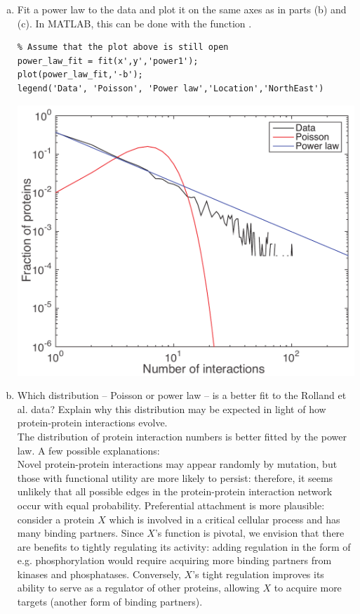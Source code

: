 \documentclass{article}
\begin{document}
\begin{enumerate}[a)]
\setlength{\itemsep}{0pt}
\setcounter{enumi}{3}
\item  Fit a power law to the data and plot it on the same axes as in parts (b) and (c). In MATLAB, this can be done with the function .\\

\begin{lstlisting}
% Assume that the plot above is still open
power_law_fit = fit(x',y','power1');
plot(power_law_fit,'-b');
legend('Data', 'Poisson', 'Power law','Location','NorthEast')
\end{lstlisting}

\begin{center}\includegraphics[width=0.4 \textwidth]{prob2d.pdf}\end{center}

\item Which distribution -- Poisson or power law -- is a better fit to the Rolland et al. data? Explain why this distribution may be expected in light of how protein-protein interactions evolve.\\

{\color{red}
The distribution of protein interaction numbers is better fitted by the power law. A few possible explanations:\\

Novel protein-protein interactions may appear randomly by mutation, but those with functional utility are more likely to persist: therefore, it seems unlikely that all possible edges in the protein-protein interaction network occur with equal probability. Preferential attachment is more plausible: consider a protein $X$ which is involved in a critical cellular process and has many binding partners. Since $X$'s function is pivotal, we envision that there are benefits to tightly regulating its activity: adding regulation in the form of e.g. phosphorylation would require acquiring more binding partners from kinases and phosphatases. Conversely, $X$'s tight regulation improves its ability to serve as a regulator of other proteins, allowing $X$ to acquire more targets (another form of binding partners).\\

}
\end{enumerate}
\end{document}
